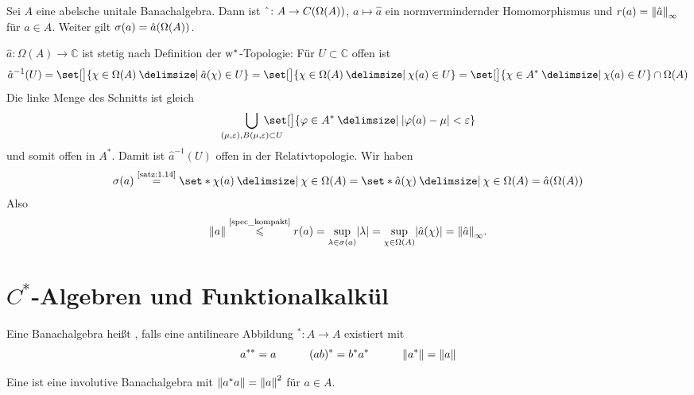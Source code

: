 \begin{satz}
	Sei $A$ eine abelsche unitale Banachalgebra. Dann ist $\hat{\hspace{1ex}} \colon A \to C \enbrace*{\Omega(A)}$, $a \mapsto \hat{a}$ ein normvermindernder Homomorphismus und 
	$r(a) = \norm{\hat{a}}_{\infty}$ für $a \in A$. Weiter gilt $\sigma(a)= \hat{a}\enbrace*{\Omega(A)}$.
\end{satz}
\begin{beweis}
	$\hat{a} \colon \Omega(A) \to \mathbb{C}$ ist stetig nach Definition der $\mathrm{w}^*$-Topologie: Für $U \subset \mathbb{C}$ offen ist
	\[
		\hat{a}^{-1}(U) = \set[\big]{\chi \in \Omega(A) \given  \hat{a}(\chi) \in U} = \set[\big]{\chi \in \Omega(A) \given \chi(a) \in U} = 
		\set[\big]{\chi \in A^* \given \chi(a) \in U} \cap \Omega(A)
	\]
	Die linke Menge des Schnitts ist gleich
	\[
		\smashoperator[r]{\bigcup_{(\mu,\varepsilon), B(\mu,\varepsilon) \subset U}} \,\,\set[\big]{\varphi \in A^* \given \abs{\varphi(a)-\mu}<\varepsilon }
	\]
	und somit offen in $A^*$. Damit ist $\hat{a}^{-1}(U)$ offen in der Relativtopologie. Wir haben
	\begin{align}
		\sigma(a) \StackText{\ref{satz:1.14}}{=} \set*{\chi(a) \given \chi \in \Omega(A)}  = \set*{\hat{a}(\chi) \given \chi \in \Omega(A)} = \hat{a} 
		\enbrace*{\Omega(A)}
	\end{align}
	Also 
	\[
		\norm{a} \StackText{\ref{spec_kompakt}}{\le} r(a) = \sup_{\lambda \in \sigma(a)} \abs{\lambda} = \sup_{\chi \in \Omega(A)} \abs{\hat{a}(\chi)} 
		= \norm{\hat{a}}_{\infty}.
	\]
\end{beweis}
\newpage

\section{$C^*$-Algebren und Funktionalkalkül} %
\label{sec:2}

\begin{definition}[{name=[Involutive Banachalgebra]}]
	Eine Banachalgebra heißt , falls eine antilineare Abbildung ${}^* \colon A \to A$ existiert mit
	\[
		a^{**}=a \qquad \quad (ab)^*= b^* a^* \qquad \quad \norm{a^*} = \norm{a}  
	\] 
\end{definition}

\begin{definition}[{name=[$C^*$-Algebra]}]
	Eine  ist eine involutive Banachalgebra mit $\norm{a^*a}= \norm{a}^2$ für $a \in A$.
\end{definition}

